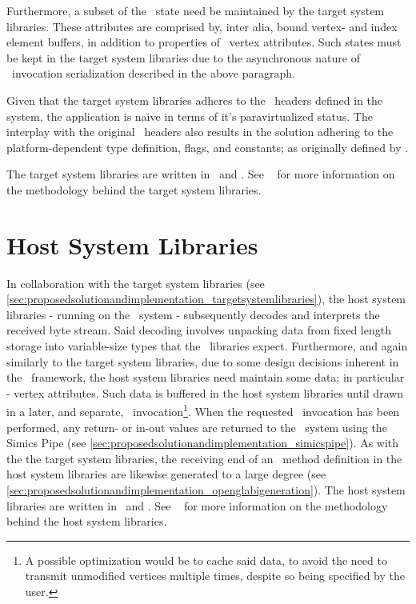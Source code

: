 Furthermore, a subset of the \dvttermopengl\ state need be maintained by the target system libraries.
These attributes are comprised by, inter alia, bound vertex- and index element buffers, in addition to properties of \dvttermopengl\ vertex attributes.
Such states must be kept in the target system libraries due to the asynchronous nature of \dvttermopengl\ invocation serialization described in the above paragraph.

Given that the target system libraries adheres to the \dvttermopengl\ headers defined in the system, the application is na\"{\i}ve in terms of it's paravirtualized status.
The interplay with the original \dvttermopengles\ headers also results in the solution adhering to the platform-dependent type definition, flags, and constants; as originally defined by \dvttermkhronos .

The target system libraries are written in \dvttermc\ and \dvttermcplusplus .
See ~ for more information on the methodology behind the target system libraries.

\section{Host System Libraries}
\label{sec:proposedsolutionandimplementation_hostsystemlibraries}
In collaboration with the target system libraries (see \ref{sec:proposedsolutionandimplementation_targetsystemlibraries}), the host system libraries - running on the \dvttermhost\ system - subsequently decodes and interprets the received byte stream.
Said decoding involves unpacking data from fixed length storage into variable-size types that the \dvttermopengl\ libraries expect.
Furthermore, and again similarly to the target system libraries, due to some design decisions inherent in the \dvttermopenglestwopointo\ framework, the host system libraries need maintain some data; in particular - vertex attributes.
Such data is buffered in the host system libraries until drawn in a later, and separate, \dvttermopengl\ invocation\footnote{A possible optimization would be to cache said data, to avoid the need to transmit unmodified vertices multiple times, despite so being specified by the user.}.
When the requested \dvttermopengl\ invocation has been performed, any return- or in-out values are returned to the \dvttermtarget\ system using the Simics Pipe (see \ref{sec:proposedsolutionandimplementation_simicspipe}).
As with the the target system libraries, the receiving end of an \dvttermopengl\ method definition in the host system libraries are likewise generated to a large degree (see \ref{sec:proposedsolutionandimplementation_openglabigeneration}).
The host system libraries are written in \dvttermc\ and \dvttermcplusplus .
See ~ for more information on the methodology behind the host system libraries.

